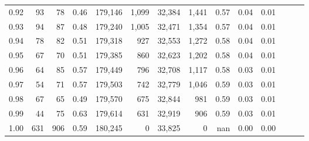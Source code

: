 \begin{tabular}{rrrrrrrrrrrrrr}
0.92 &     93 &   78 &  0.46 &  179,146 &    1,099 &  32,384 &   1,441 &  0.57 &  0.04 &      0.01 \\
0.93 &     94 &   87 &  0.48 &  179,240 &    1,005 &  32,471 &   1,354 &  0.57 &  0.04 &      0.01 \\
0.94 &     78 &   82 &  0.51 &  179,318 &      927 &  32,553 &   1,272 &  0.58 &  0.04 &      0.01 \\
0.95 &     67 &   70 &  0.51 &  179,385 &      860 &  32,623 &   1,202 &  0.58 &  0.04 &      0.01 \\
0.96 &     64 &   85 &  0.57 &  179,449 &      796 &  32,708 &   1,117 &  0.58 &  0.03 &      0.01 \\
0.97 &     54 &   71 &  0.57 &  179,503 &      742 &  32,779 &   1,046 &  0.59 &  0.03 &      0.01 \\
0.98 &     67 &   65 &  0.49 &  179,570 &      675 &  32,844 &     981 &  0.59 &  0.03 &      0.01 \\
0.99 &     44 &   75 &  0.63 &  179,614 &      631 &  32,919 &     906 &  0.59 &  0.03 &      0.01 \\
1.00 &    631 &  906 &  0.59 &  180,245 &        0 &  33,825 &       0 &   nan &  0.00 &      0.00 \\
\bottomrule
\end{tabular}
